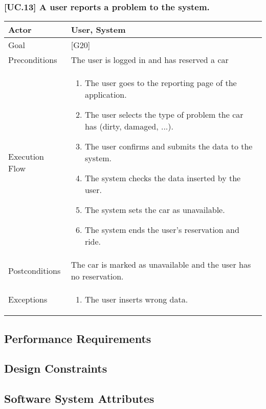\documentclass[english]{article}
\begin{document}
  \subsubsection{[UC.13] A user reports a problem to the system.}
  \begin{tabularx}{\textwidth}{  l  X  }
  	\hline
  	Actor & User, System\\
  	\hline
  	Goal & [G20]\\
  	\hline
  	Preconditions & The user is logged in and has reserved a car\\
  	\hline
  	Execution Flow & \begin{enumerate}
  		\item{The user goes to the reporting page of the application.}
  		\item{The user selects the type of problem the car has (dirty, damaged, ...).}
  		\item{The user confirms and submits the data to the system.}
  		\item{The system checks the data inserted by the user.}
  		\item{The system sets the car as unavailable.}
  		\item{The system ends the user's reservation and ride.}
  	\end{enumerate}\\
  	\hline
  	Postconditions & The car is marked as unavailable and the user has no reservation.\\
  	\hline
  	Exceptions & \begin{enumerate}
  		\item{The user inserts wrong data.}
  	\end{enumerate}\\
  	\hline
  \end{tabularx}


\subsection{Performance Requirements}

\subsection{Design Constraints}

\subsection{Software System Attributes}
\end{document}
